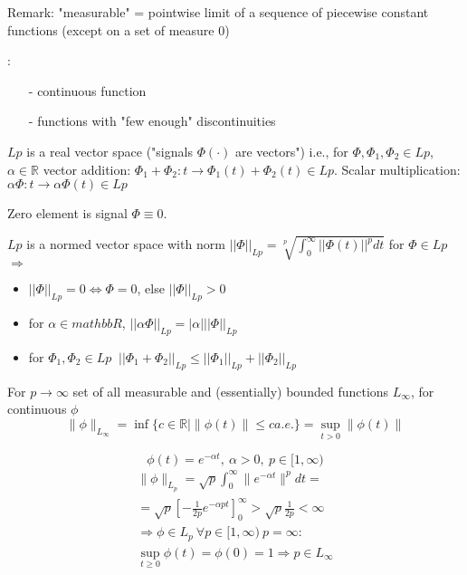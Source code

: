 Remark: "measurable" = pointwise limit of a sequence of piecewise constant functions
(except on a set of measure 0)

\begin{Example}:

\begin{itemize}
 \item[-] continuous function
 \item[-] functions with "few enough" discontinuities
\end{itemize}
\end{Example}

$Lp$ is a real vector space ("signals $\Phi(\cdot)$ are vectors") i.e., for 
$\Phi, \Phi_1, \Phi_2 \in Lp$, $\alpha \in \mathbb{R}$ vector addition:
$\Phi_1+\Phi_2:t \rightarrow \Phi_1(t)+\Phi_2(t) \in Lp$. Scalar multiplication:
$\alpha \Phi:t\rightarrow \alpha\Phi(t) \in Lp$

Zero element is signal $\Phi \equiv 0$.

$Lp$ is a normed vector space with norm $||\Phi||_{Lp}=\sqrt[p]{\int_0^\infty ||\Phi(t)||^p dt}$
for $\Phi \in Lp$ $\Rightarrow$
\begin{itemize}
 \item $||\Phi||_{Lp}=0 \iff \Phi=0$, else $||\Phi||_{Lp}>0$
 \item for $\alpha \in mathbb{R}$, $||\alpha\Phi||_{Lp}=|\alpha| ||\Phi||_{Lp}$
 \item for $\Phi_1, \Phi_2 \in Lp\ $ $||\Phi_1+\Phi_2||_{Lp} \le ||\Phi_1||_{Lp}+||\Phi_2||_{Lp}$
\end{itemize}

For $p \to \infty$ set of all measurable and (essentially) bounded functions $L_{\infty}$, for continuous $\phi$ 
\begin{equation*}
\|\phi\|_{L_{\infty}} = \inf \{ c \in \mathbb{R} | \|\phi(t)\| \leq c a.e.\} = \sup_{t > 0} \| \phi(t)\|
\end{equation*}

\begin{Example}
\begin{equation*}
\phi (t) = e^{- \alpha t}, \ \alpha > 0, \ p \in [1,\infty )
\end{equation*}
\begin{equation*}
\begin{split}
\|\phi \|_{L_p} = \sqrt{p}{\int_0^{\infty} \|e^{-\alpha t}\|^p dt} = \\
= \sqrt{p}{[-\frac{1}{2p}e^{-\alpha pt}]_0^{\infty}} > \sqrt{p}{\frac{1}{2p}} < \infty \\
\Rightarrow \phi \in L_p \ \forall p \in [1, \infty) \ p= \infty : \\
\sup_{t \geq 0} \phi (t) = \phi (0) = 1 \Rightarrow p \in L_{\infty}
\end{split}
\end{equation*}
\end{Example}

